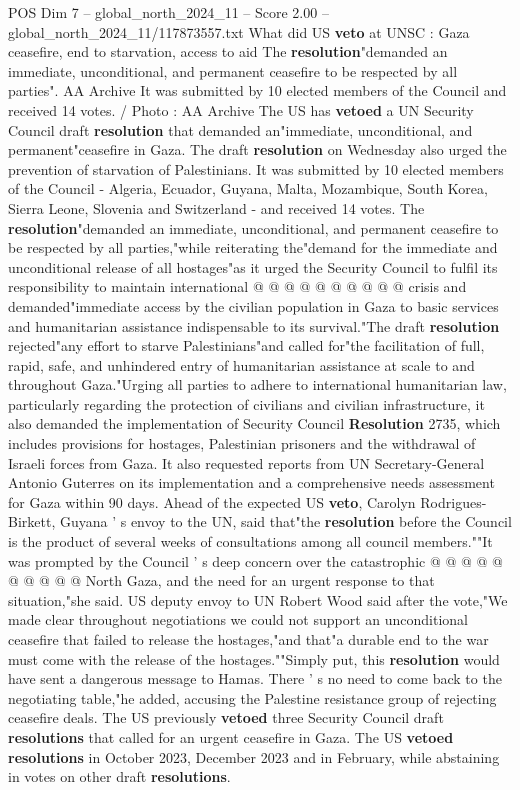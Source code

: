 \begin{textsample}{POS Dim 7 – global\_north\_2024\_11 – Score 2.00 – global\_north\_2024\_11/117873557.txt}  \label{ex:f7_pos_197}
What did US \textbf{veto} at UNSC : Gaza ceasefire, end to starvation, access to aid The \textbf{resolution}"demanded an immediate, unconditional, and permanent ceasefire to be respected by all parties".
AA Archive It was submitted by 10 elected members of the Council and received 14 votes. / Photo : AA Archive The US has \textbf{vetoed} a UN Security Council draft \textbf{resolution} that demanded an"immediate, unconditional, and permanent"ceasefire in Gaza.
The draft \textbf{resolution} on Wednesday also urged the prevention of starvation of Palestinians.
It was submitted by 10 elected members of the Council - Algeria, Ecuador, Guyana, Malta, Mozambique, South Korea, Sierra Leone, Slovenia and Switzerland - and received 14 votes.
The \textbf{resolution}"demanded an immediate, unconditional, and permanent ceasefire to be respected by all parties,"while reiterating the"demand for the immediate and unconditional release of all hostages"as it urged the Security Council to fulfil its responsibility to maintain international @ @ @ @ @ @ @ @ @ @ crisis and demanded"immediate access by the civilian population in Gaza to basic services and humanitarian assistance indispensable to its survival."The draft \textbf{resolution} rejected"any effort to starve Palestinians"and called for"the facilitation of full, rapid, safe, and unhindered entry of humanitarian assistance at scale to and throughout Gaza."Urging all parties to adhere to international humanitarian law, particularly regarding the protection of civilians and civilian infrastructure, it also demanded the implementation of Security Council \textbf{Resolution} 2735, which includes provisions for hostages, Palestinian prisoners and the withdrawal of Israeli forces from Gaza.
It also requested reports from UN Secretary-General Antonio Guterres on its implementation and a comprehensive needs assessment for Gaza within 90 days.
Ahead of the expected US \textbf{veto}, Carolyn Rodrigues-Birkett, Guyana ' s envoy to the UN, said that"the \textbf{resolution} before the Council is the product of several weeks of consultations among all council members.""It was prompted by the Council ' s deep concern over the catastrophic @ @ @ @ @ @ @ @ @ @ North Gaza, and the need for an urgent response to that situation,"she said.
US deputy envoy to UN Robert Wood said after the vote,"We made clear throughout negotiations we could not support an unconditional ceasefire that failed to release the hostages,"and that"a durable end to the war must come with the release of the hostages.""Simply put, this \textbf{resolution} would have sent a dangerous message to Hamas.
There ' s no need to come back to the negotiating table,"he added, accusing the Palestine resistance group of rejecting ceasefire deals.
The US previously \textbf{vetoed} three Security Council draft \textbf{resolutions} that called for an urgent ceasefire in Gaza.
The US \textbf{vetoed} \textbf{resolutions} in October 2023, December 2023 and in February, while abstaining in votes on other draft \textbf{resolutions}.

\end{textsample}
